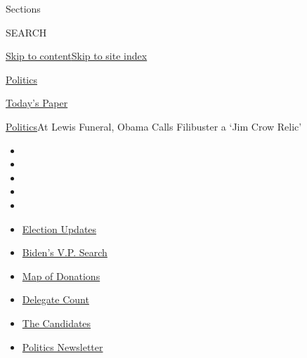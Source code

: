 Sections

SEARCH

\protect\hyperlink{site-content}{Skip to
content}\protect\hyperlink{site-index}{Skip to site index}

\href{https://www.nytimes.com/section/politics}{Politics}

\href{https://myaccount.nytimes.com/auth/login?response_type=cookie\&client_id=vi}{}

\href{https://www.nytimes.com/section/todayspaper}{Today's Paper}

\href{/section/politics}{Politics}\textbar{}At Lewis Funeral, Obama
Calls Filibuster a `Jim Crow Relic'

\begin{itemize}
\item
\item
\item
\item
\item
\end{itemize}

\begin{itemize}
\item
  \href{https://www.nytimes.com/2020/07/31/us/elections/biden-vs-trump.html?action=click\&pgtype=Article\&state=default\&region=TOP_BANNER\&context=storylines_menu}{Election
  Updates}
\item
  \href{https://www.nytimes.com/article/biden-vice-president-2020.html?action=click\&pgtype=Article\&state=default\&region=TOP_BANNER\&context=storylines_menu}{Biden's
  V.P. Search}
\item
  \href{https://www.nytimes.com/interactive/2020/07/24/us/politics/trump-biden-campaign-donors.html?action=click\&pgtype=Article\&state=default\&region=TOP_BANNER\&context=storylines_menu}{Map
  of Donations}
\item
  \href{https://www.nytimes.com/interactive/2020/us/elections/delegate-count-primary-results.html?action=click\&pgtype=Article\&state=default\&region=TOP_BANNER\&context=storylines_menu}{Delegate
  Count}
\item
  \href{https://www.nytimes.com/interactive/2019/us/politics/2020-presidential-candidates.html?action=click\&pgtype=Article\&state=default\&region=TOP_BANNER\&context=storylines_menu}{The
  Candidates}
\item
  \href{https://www.nytimes.com/newsletters/politics?action=click\&pgtype=Article\&state=default\&region=TOP_BANNER\&context=storylines_menu}{Politics
  Newsletter}
\end{itemize}


